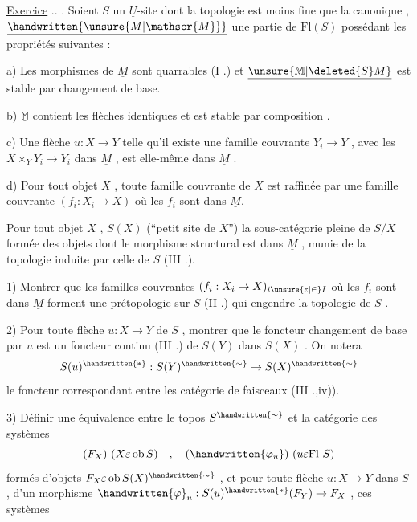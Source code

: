 \uline{Exercice} .. . Soient \(S\) un \(\underline{U}\)-site dont la topologie est moins fine que la canonique , \(\underline{\handwritten{\unsure{M|\mathscr{M}}}}\) une partie de \(\mathrm{Fl}(S)\) possédant les propriétés suivantes :

 a) Les morphismes de \(\underline{M}\) sont quarrables (I .) et \(\underline{\unsure{\mathbb{M}|\deleted{S}M}}\) est stable par changement de base.

 b) \(\underline{\mathbb{M}}\) contient les flèches identiques et est stable par composition .

 c) Une flèche \(u:X\to Y\) telle qu'il existe une famille couvrante \(Y_i\to Y\) , avec les \(X\times_Y Y_i\to Y_i\) dans \(\underline{M}\) , est elle-même dans \(\underline{M}\) .

 d) Pour tout objet \(X\) , toute famille couvrante de \(X\) est raffinée par une famille couvrante \((f_i:X_i\to X)\) où les \(f_i\) sont dans \(\underline{M}\).

Pour tout objet \(X\) ,  \(S(X)\) (``petit site de \(X\)'')   la sous-catégorie pleine de \(S/X\) formée des objets dont le morphisme structural est dans \(\underline{M}\) , munie de la topologie induite par celle de \(S\) (III .).

1) Montrer que les familles couvrantes \((f_i:X_i\to X)_{i\unsure{\varepsilon|\in}I}\) où les \(f_i\) sont dans \(\underline{M}\) forment une prétopologie sur \(S\) (II .) qui engendre la topologie de \(S\) .

2) Pour toute flèche \(u:X\to Y\) de \(S\) , montrer que le foncteur changement de base par \(u\) est un foncteur continu (III .) de \(S(Y)\) dans \(S(X)\) . On notera
\[
S(u)^{\handwritten{*}}:S(Y)^{\handwritten{\sim}}\to S(X)^{\handwritten{\sim}}
\]
le foncteur correspondant entre les catégorie de faisceaux (III .,iv)).

3) Définir une équivalence entre le topos \(S^{\handwritten{\sim}}\) et la catégorie des systèmes
\[
(F_X)\ (X\varepsilon\operatorname{ob}S)\quad,\quad(\handwritten{\varphi_u})\ (u\varepsilon\mathrm{Fl}\ S)
\]
formés d'objets \(F_X\varepsilon\operatorname{ob}S(X)^{\handwritten{\sim}}\) , et pour toute flèche \(u:X\to Y\) dans \(S\) , d'un morphisme \(\handwritten{\varphi}_u:S(u)^{\handwritten{*}}(F_Y)\to F_X\) , ces systèmes


